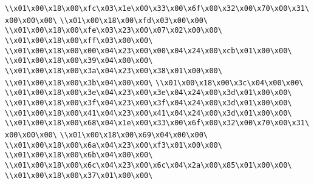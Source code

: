 \verb|\\x01\x00\x18\x00\xfc\x03\x1e\x00\x33\x00\x6f\x00\x32\x00\x70\x00\x31\x00\x00\x00\|\newline
\verb|\\x01\x00\x18\x00\xfd\x03\x00\x00\|\newline
\verb|\\x01\x00\x18\x00\xfe\x03\x23\x00\x07\x02\x00\x00\|\newline
\verb|\\x01\x00\x18\x00\xff\x03\x00\x00\|\newline
\verb|\\x01\x00\x18\x00\x00\x04\x23\x00\x00\x04\x24\x00\xcb\x01\x00\x00\|\newline
\verb|\\x01\x00\x18\x00\x39\x04\x00\x00\|\newline
\verb|\\x01\x00\x18\x00\x3a\x04\x23\x00\x38\x01\x00\x00\|\newline
\verb|\\x01\x00\x18\x00\x3b\x04\x00\x00\|\newline
\verb|\\x01\x00\x18\x00\x3c\x04\x00\x00\|\newline
\verb|\\x01\x00\x18\x00\x3e\x04\x23\x00\x3e\x04\x24\x00\x3d\x01\x00\x00\|\newline
\verb|\\x01\x00\x18\x00\x3f\x04\x23\x00\x3f\x04\x24\x00\x3d\x01\x00\x00\|\newline
\verb|\\x01\x00\x18\x00\x41\x04\x23\x00\x41\x04\x24\x00\x3d\x01\x00\x00\|\newline
\verb|\\x01\x00\x18\x00\x68\x04\x1e\x00\x33\x00\x6f\x00\x32\x00\x70\x00\x31\x00\x00\x00\|\newline
\verb|\\x01\x00\x18\x00\x69\x04\x00\x00\|\newline
\verb|\\x01\x00\x18\x00\x6a\x04\x23\x00\xf3\x01\x00\x00\|\newline
\verb|\\x01\x00\x18\x00\x6b\x04\x00\x00\|\newline
\verb|\\x01\x00\x18\x00\x6c\x04\x23\x00\x6c\x04\x2a\x00\x85\x01\x00\x00\|\newline
\verb|\\x01\x00\x18\x00\x37\x01\x00\x00\|\newline
